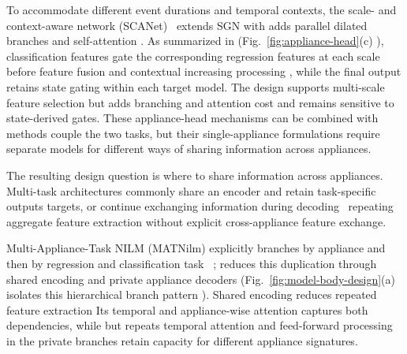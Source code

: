 \documentclass[journal]{IEEEtran}
\providecommand{\DIFadd}[1]{{\protect\color{blue} \sf #1}} %
\providecommand{\DIFdel}[1]{{\protect\color{red} \scriptsize #1}} %
\providecommand{\DIFaddbegin}{} %
\providecommand{\DIFaddend}{} %
\providecommand{\DIFdelbegin}{} %
\providecommand{\DIFdelend}{} %
\providecommand{\DIFscaledelfig}{0.5}
\newlength{\DIFdelgraphicswidth} %
\newlength{\DIFdelgraphicsheight} %
\providecommand{\DIFaddincludegraphics}[2][]{{\color{blue}\fbox{\DIFOincludegraphics[#1]{#2}}}} %
\providecommand{\DIFdelincludegraphics}[2][]{%
\sbox{\DIFdelgraphicsbox}{\DIFOincludegraphics[#1]{#2}}%
\settoboxwidth{\DIFdelgraphicswidth}{\DIFdelgraphicsbox} %
\settoboxtotalheight{\DIFdelgraphicsheight}{\DIFdelgraphicsbox} %
\scalebox{\DIFscaledelfig}{%
\parbox[b]{\DIFdelgraphicswidth}{\usebox{\DIFdelgraphicsbox}\\[-\baselineskip] \rule{\DIFdelgraphicswidth}{0em}}\llap{\resizebox{\DIFdelgraphicswidth}{\DIFdelgraphicsheight}{%
\setlength{\unitlength}{\DIFdelgraphicswidth}%
\begin{picture}(1,1)%
\thicklines\linethickness{2pt} %
{\color[rgb]{1,0,0}\put(0,0){\framebox(1,1){}}}%
{\color[rgb]{1,0,0}\put(0,0){\line( 1,1){1}}}%
{\color[rgb]{1,0,0}\put(0,1){\line(1,-1){1}}}%
\end{picture}%
}\hspace*{3pt}}} %
} %
\DeclareRobustCommand{\DIFaddbegin}{\DIFOaddbegin \let\includegraphics\DIFaddincludegraphics} %
\DeclareRobustCommand{\DIFaddend}{\DIFOaddend \let\includegraphics\DIFOincludegraphics} %
\DeclareRobustCommand{\DIFdelbegin}{\DIFOdelbegin \let\includegraphics\DIFdelincludegraphics} %
\DeclareRobustCommand{\DIFdelend}{\DIFOaddend \let\includegraphics\DIFOincludegraphics} %
\begin{document}
\DIFdel{To accommodate different event durations and temporal contexts, the }\DIFdelend scale- and context-aware network (SCANet)~\cite{chen2021sca} \DIFdelbegin \DIFdel{extends SGN with }\DIFdelend \DIFaddbegin \DIFadd{adds }\DIFaddend parallel dilated branches and self-attention \DIFdelbegin \DIFdel{. As summarized in }\DIFdelend \DIFaddbegin \DIFadd{(}\DIFaddend Fig.~\ref{fig:appliance-head}(c)\DIFaddbegin \DIFadd{)}\DIFaddend , \DIFdelbegin \DIFdel{classification features gate the corresponding regression features at each scale before feature fusion and contextual }\DIFdelend \DIFaddbegin \DIFadd{increasing }\DIFaddend processing \DIFdelbegin \DIFdel{, while the final output retains state gating}\DIFdelend \DIFaddbegin \DIFadd{within each target model}\DIFaddend . \DIFdelbegin \DIFdel{The design supports multi-scale feature selection but adds branching and attention cost and remains sensitive to state-derived gates. }\DIFdelend These \DIFdelbegin \DIFdel{appliance-head mechanisms can be combined with }\DIFdelend \DIFaddbegin \DIFadd{methods couple the two tasks, but their single-appliance formulations require separate models for }\DIFaddend different \DIFdelbegin \DIFdel{ways of sharing information across appliances.
}%

\DIFdel{The resulting design question is where to share information across appliances. Multi-task architectures commonly share an encoder and retain task-specific outputs}\DIFdelend \DIFaddbegin \DIFadd{targets}\DIFaddend , \DIFdelbegin \DIFdel{or continue exchanging information during decoding~\cite{vandenhende2022survey}}\DIFdelend \DIFaddbegin \DIFadd{repeating aggregate feature extraction without explicit cross-appliance feature exchange}\DIFaddend .
\DIFaddbegin 

\DIFaddend Multi-Appliance-Task NILM (MATNilm)\DIFdelbegin \DIFdel{explicitly branches by appliance and then by regression and classification task}\DIFdelend ~\cite{xiong2024matnilm} \DIFdelbegin \DIFdel{; }\DIFdelend \DIFaddbegin \DIFadd{reduces this duplication through shared encoding and private appliance decoders (}\DIFaddend Fig.~\ref{fig:model-body-design}(a)\DIFdelbegin \DIFdel{isolates this hierarchical branch pattern}\DIFdelend \DIFaddbegin \DIFadd{)}\DIFaddend . \DIFdelbegin \DIFdel{Shared encoding reduces repeated feature extraction}\DIFdelend \DIFaddbegin \DIFadd{Its temporal and appliance-wise attention captures both dependencies}\DIFaddend , \DIFdelbegin \DIFdel{while }\DIFdelend \DIFaddbegin \DIFadd{but repeats temporal attention and feed-forward processing in the }\DIFaddend private branches\DIFdelbegin \DIFdel{retain capacity for different appliance signatures}\DIFdelend . \DIFdelbegin %
\end{document}
